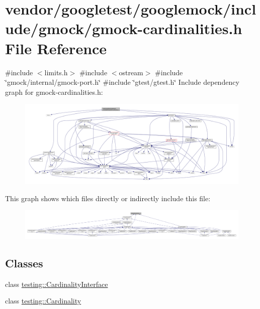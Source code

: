 \hypertarget{gmock-cardinalities_8h}{}\section{vendor/googletest/googlemock/include/gmock/gmock-\/cardinalities.h File Reference}
\label{gmock-cardinalities_8h}
{\ttfamily \#include $<$limits.\+h$>$}\newline
{\ttfamily \#include $<$ostream$>$}\newline
{\ttfamily \#include \char`\"{}gmock/internal/gmock-\/port.\+h\char`\"{}}\newline
{\ttfamily \#include \char`\"{}gtest/gtest.\+h\char`\"{}}\newline
Include dependency graph for gmock-\/cardinalities.h\+:
\nopagebreak
\begin{figure}[H]
\begin{center}
\leavevmode
\includegraphics[width=350pt]{gmock-cardinalities_8h__incl}
\end{center}
\end{figure}
This graph shows which files directly or indirectly include this file\+:
\nopagebreak
\begin{figure}[H]
\begin{center}
\leavevmode
\includegraphics[width=350pt]{gmock-cardinalities_8h__dep__incl}
\end{center}
\end{figure}
\subsection*{Classes}
\begin{DoxyCompactItemize}
\item 
class \hyperlink{classtesting_1_1_cardinality_interface}{testing\+::\+Cardinality\+Interface}
\item 
class \hyperlink{classtesting_1_1_cardinality}{testing\+::\+Cardinality}
\end{DoxyCompactItemize}

